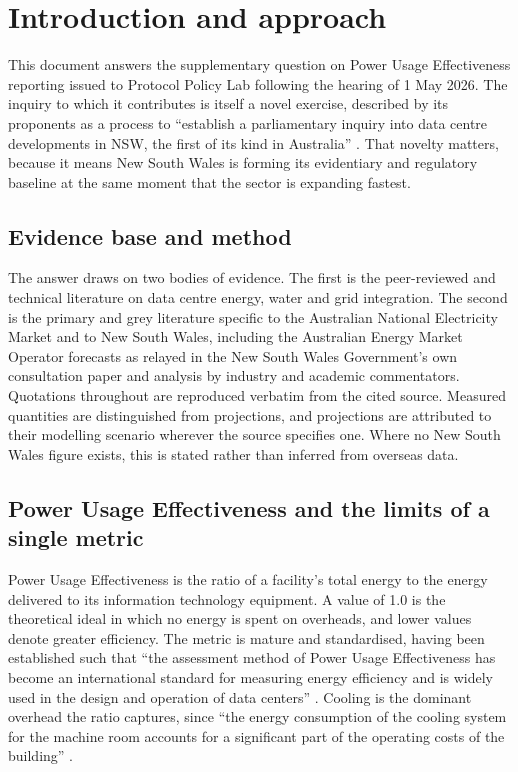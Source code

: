 \chapter{Introduction and approach}
\label{ch:sq1:intro}

This document answers the supplementary question on Power Usage Effectiveness reporting issued to Protocol Policy Lab following the hearing of 1 May 2026. The inquiry to which it contributes is itself a novel exercise, described by its proponents as a process to \enquote{establish a parliamentary inquiry into data centre developments in NSW, the first of its kind in Australia} \autocite{greensNSWDataCentreInquiry2026}. That novelty matters, because it means New South Wales is forming its evidentiary and regulatory baseline at the same moment that the sector is expanding fastest.

\section{Evidence base and method}
\label{sec:sq1:method}

The answer draws on two bodies of evidence. The first is the peer-reviewed and technical literature on data centre energy, water and grid integration. The second is the primary and grey literature specific to the Australian National Electricity Market and to New South Wales, including the Australian Energy Market Operator forecasts as relayed in the New South Wales Government's own consultation paper and analysis by industry and academic commentators. Quotations throughout are reproduced verbatim from the cited source. Measured quantities are distinguished from projections, and projections are attributed to their modelling scenario wherever the source specifies one. Where no New South Wales figure exists, this is stated rather than inferred from overseas data.

\section{Power Usage Effectiveness and the limits of a single metric}
\label{sec:sq1:pue-defn}

Power Usage Effectiveness is the ratio of a facility's total energy to the energy delivered to its information technology equipment. A value of 1.0 is the theoretical ideal in which no energy is spent on overheads, and lower values denote greater efficiency. The metric is mature and standardised, having been established such that \enquote{the assessment method of Power Usage Effectiveness has become an international standard for measuring energy efficiency and is widely used in the design and operation of data centers} \autocite{uanovAnalysisMethodsAssessing2022}. Cooling is the dominant overhead the ratio captures, since \enquote{the energy consumption of the cooling system for the machine room accounts for a significant part of the operating costs of the building} \autocite{uanovAnalysisMethodsAssessing2022}.

